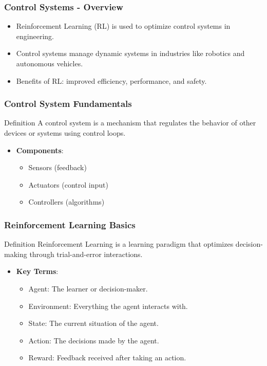 \documentclass[aspectratio=169]{beamer}
\begin{document}
\begin{frame}[fragile]
    \frametitle{Control Systems - Overview}
    \begin{itemize}
        \item Reinforcement Learning (RL) is used to optimize control systems in engineering.
        \item Control systems manage dynamic systems in industries like robotics and autonomous vehicles.
        \item Benefits of RL: improved efficiency, performance, and safety.
    \end{itemize}
\end{frame}

\begin{frame}[fragile]
    \frametitle{Control System Fundamentals}
    \begin{block}{Definition}
        A control system is a mechanism that regulates the behavior of other devices or systems using control loops.
    \end{block}
    \begin{itemize}
        \item \textbf{Components}:
        \begin{itemize}
            \item Sensors (feedback)
            \item Actuators (control input)
            \item Controllers (algorithms)
        \end{itemize}
    \end{itemize}
\end{frame}

\begin{frame}[fragile]
    \frametitle{Reinforcement Learning Basics}
    \begin{block}{Definition}
        Reinforcement Learning is a learning paradigm that optimizes decision-making through trial-and-error interactions.
    \end{block}
    \begin{itemize}
        \item \textbf{Key Terms}:
        \begin{itemize}
            \item Agent: The learner or decision-maker.
            \item Environment: Everything the agent interacts with.
            \item State: The current situation of the agent.
            \item Action: The decisions made by the agent.
            \item Reward: Feedback received after taking an action.
        \end{itemize}
    \end{itemize}
\end{frame}
\end{document}

